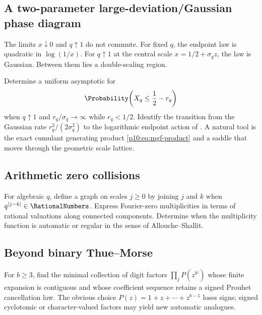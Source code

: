 \documentclass[11pt]{article}
\numberwithin{equation}{section}
\theoremstyle{definition}
\theoremstyle{remark}
\begin{document}
\subsection{A two-parameter large-deviation/Gaussian phase diagram}

The limits $x\downarrow0$ and $q\uparrow1$ do not commute.  For fixed $q$, the endpoint law is
quadratic in $\log(1/x)$.  For $q\uparrow1$ at the central scale
$x=1/2+\sigma_qz$, the law is Gaussian.  Between them lies a double-scaling region.

\begin{problem}
Determine a uniform asymptotic for
\[
 \Probability\!\left(X_q\le\frac12-r_q\right)
\]
when $q\uparrow1$ and $r_q/\sigma_q\to\infty$ while $r_q<1/2$.  Identify the transition from
the Gaussian rate $r_q^2/(2\sigma_q^2)$ to the logarithmic endpoint action of
.  A natural tool is the exact cumulant generating product
\eqref{p10:eq:mgf-product} and a saddle that moves through the geometric scale lattice.
\end{problem}

\subsection{Arithmetic zero collisions}

\begin{problem}
For algebraic $q$, define a graph on scales $j\ge0$ by joining $j$ and $k$ when
$q^{|j-k|}\in\RationalNumbers$.  Express Fourier-zero multiplicities in terms of rational valuations along
connected components.  Determine when the multiplicity function is automatic or regular in
the sense of Allouche--Shallit.
\end{problem}

\subsection{Beyond binary Thue--Morse}

\begin{problem}
For $b\ge3$, find the minimal collection of digit factors
\(
 \prod_j P(z^{b^j})
\)
whose finite expansion is contiguous and whose coefficient sequence retains a signed
Prouhet cancellation law.  The obvious choice
$P(z)=1+z+\cdots+z^{b-1}$ loses signs; signed cyclotomic or character-valued factors may yield
new automatic analogues.
\end{problem}
\end{document}
